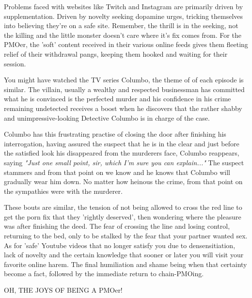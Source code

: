 \documentclass[easypeasy.tex]{subfiles}
\begin{document}
Problems faced with websites like Twitch and Instagram are primarily driven by supplementation. Driven by novelty seeking dopamine urges, tricking themselves into believing they're on a safe site. Remember, the thrill is in the seeking, not the killing and the little monster doesn't care where it's fix comes from. For the PMOer, the 'soft' content received in their various online feeds gives them fleeting relief of their withdrawal pangs, keeping them hooked and waiting for their session.

You might have watched the TV series Columbo, the theme of of each episode is similar. The villain, usually a wealthy and respected businessman has committed what he is convinced is the perfected murder and his confidence in his crime remaining undetected receives a boost when he discovers that the rather shabby and unimpressive-looking Detective Columbo is in charge of the case.

Columbo has this frustrating practise of closing the door after finishing his interrogation, having assured the suspect that he is in the clear and just before the satisfied look his disappeared from the murderers face, Columbo reappears, saying \textit{"Just one small point, sir, which I'm sure you can explain..."} The suspect stammers and from that point on we know and he knows that Columbo will gradually wear him down. No matter how heinous the crime, from that point on the sympathies were with the murderer.

These bouts are similar, the tension of not being allowed to cross the red line to get the porn fix that they 'rightly deserved', then wondering where the pleasure was after finishing the deed. The fear of crossing the line and losing control, returning to the bed, only to be stalked by the fear that your partner wanted sex. As for 'safe' Youtube videos that no longer satisfy you due to densensitiation, lack of novelty and the certain knowledge that sooner or later you will visit your favorite online harem. The final humiliation and shame being when that certainty become a fact, followed by the immediate return to chain-PMOing.

{\huge OH, THE JOYS OF BEING A PMOer!}
\end{document}
